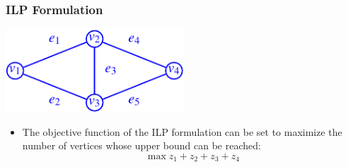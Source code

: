 \frame
{
	\frametitle{ILP Formulation}

	\begin{center}
	\includegraphics[width=0.5\textwidth]{Lec8-Genome-Rearrangement-Problem-figs/example.pdf}
	\end{center}

	\begin{itemize}
	\item<2-> The objective function of the ILP formulation can be set to maximize the number of vertices
		whose upper bound can be reached:
		\begin{displaymath}
			\max z_1 + z_2 + z_3 + z_4
		\end{displaymath}
	\end{itemize}
}
